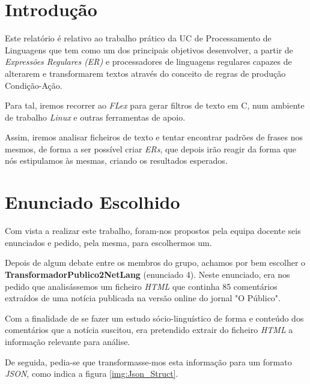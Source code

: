 \documentclass[a4paper,12pt]{report}
\begin{document}

\tableofcontents
\clearpage


\chapter{Introdução}

Este relatório é relativo ao trabalho prático da UC de Processamento de Linguagens que tem como um dos principais objetivos desenvolver, a partir de \textit{Expressões Regulares (ER)} e processadores de linguagens regulares capazes de alterarem e transformarem textos através do conceito de regras de produção Condição-Ação. 

Para tal, iremos recorrer ao \textit{FLex} para gerar filtros de texto em C, num ambiente de trabalho \textit{Linux} e outras ferramentas de apoio. 

Assim, iremos analisar ficheiros de texto e tentar encontrar padrões de frases nos mesmos, de forma a ser possível criar \textit{ERs}, que depois irão reagir da forma que nós estipulamos às mesmas, criando os resultados esperados.


\chapter{Enunciado Escolhido}

Com vista a realizar este trabalho, foram-nos propostos pela equipa docente seis enunciados e pedido, pela mesma, para escolhermos um. 
\par Depois de algum debate entre os membros do grupo, achamos por bem escolher o \textbf{TransformadorPublico2NetLang} (enunciado 4). Neste enunciado, era nos pedido que analisássemos um ficheiro \textit{HTML} que continha 85 comentários extraídos de uma notícia publicada na versão online do jornal "O Público". 

Com a finalidade de se fazer um estudo sócio-linguístico de forma e conteúdo dos comentários que a notícia suscitou, era pretendido extrair do ficheiro \textit{HTML} a informação relevante para análise. 

De seguida, pedia-se que transformasse-mos esta informação para um formato \textit{JSON}, como indica a figura \ref{img:Json_Struct}.
\end{document}
